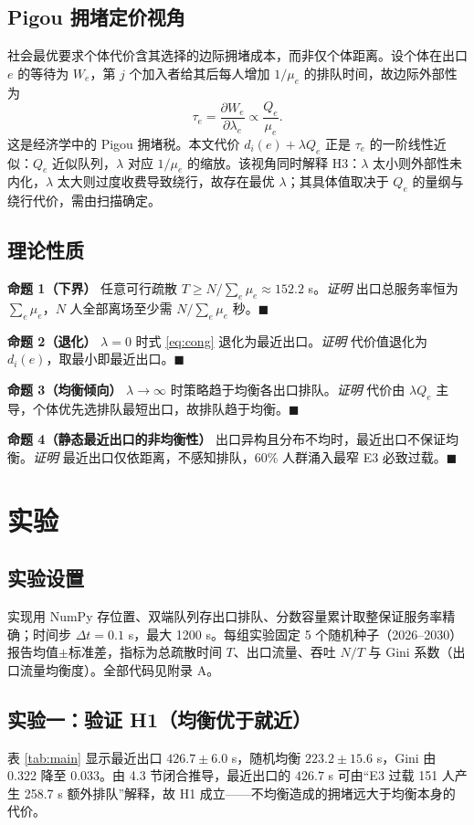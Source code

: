 ﻿\documentclass[withoutpreface,bwprint]{cumcmthesis}
\begin{document}
\subsection{Pigou 拥堵定价视角}
社会最优要求个体代价含其选择的边际拥堵成本，而非仅个体距离。设个体在出口 $e$ 的等待为 $W_e$，第 $j$ 个加入者给其后每人增加 $1/\mu_e$ 的排队时间，故边际外部性为
\begin{equation}
\tau_e=\frac{\partial W_e}{\partial \lambda_e}\propto\frac{Q_e}{\mu_e}.
\end{equation}
这是经济学中的 Pigou 拥堵税。本文代价 $d_i(e)+\lambda Q_e$ 正是 $\tau_e$ 的一阶线性近似：$Q_e$ 近似队列，$\lambda$ 对应 $1/\mu_e$ 的缩放。该视角同时解释 H3：$\lambda$ 太小则外部性未内化，$\lambda$ 太大则过度收费导致绕行，故存在最优 $\lambda$；其具体值取决于 $Q_e$ 的量纲与绕行代价，需由扫描确定。

\subsection{理论性质}
\textbf{命题 1（下界）} 任意可行疏散 $T\ge N/\sum_e\mu_e\approx152.2$ s。\emph{证明} 出口总服务率恒为 $\sum_e\mu_e$，$N$ 人全部离场至少需 $N/\sum_e\mu_e$ 秒。$\blacksquare$

\textbf{命题 2（退化）} $\lambda=0$ 时式 \eqref{eq:cong} 退化为最近出口。\emph{证明} 代价值退化为 $d_i(e)$，取最小即最近出口。$\blacksquare$

\textbf{命题 3（均衡倾向）} $\lambda\to\infty$ 时策略趋于均衡各出口排队。\emph{证明} 代价由 $\lambda Q_e$ 主导，个体优先选排队最短出口，故排队趋于均衡。$\blacksquare$

\textbf{命题 4（静态最近出口的非均衡性）} 出口异构且分布不均时，最近出口不保证均衡。\emph{证明} 最近出口仅依距离，不感知排队，60\% 人群涌入最窄 E3 必致过载。$\blacksquare$

\section{实验}

\subsection{实验设置}
实现用 NumPy 存位置、双端队列存出口排队、分数容量累计取整保证服务率精确；时间步 $\Delta t=0.1$ s，最大 1200 s。每组实验固定 5 个随机种子（2026–2030）报告均值$\pm$标准差，指标为总疏散时间 $T$、出口流量、吞吐 $N/T$ 与 Gini 系数（出口流量均衡度）。全部代码见附录 A。

\subsection{实验一：验证 H1（均衡优于就近）}
表 \ref{tab:main} 显示最近出口 $426.7\pm6.0$ s，随机均衡 $223.2\pm15.6$ s，Gini 由 0.322 降至 0.033。由 4.3 节闭合推导，最近出口的 $426.7$ s 可由“E3 过载 151 人产生 258.7 s 额外排队”解释，故 H1 成立——不均衡造成的拥堵远大于均衡本身的代价。
\end{document}
